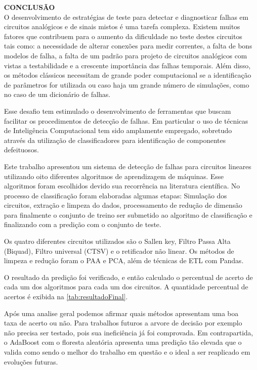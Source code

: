 \noindent\textbf{CONCLUSÃO}
$\!$\\



O desenvolvimento de estratégias de teste para detectar e diagnosticar falhas em
circuitos analógicos e de sinais mistos é uma tarefa complexa. Existem muitos fatores que
contribuem para o aumento da dificuldade no teste destes circuitos tais como: a necessidade de alterar conexões para medir correntes, a falta de bons modelos de falha, a falta de um
padrão para projeto de circuitos analógicos com vistas a testabilidade e a crescente
importância das falhas temporais. Além disso, os métodos clássicos necessitam de grande
poder computacional se a identificação de parâmetros for utilizada ou caso haja um grande número
de simulações, como no caso de um dicionário de falhas.

Esse desafio tem estimulado o desenvolvimento de ferramentas que buscam facilitar
os procedimentos de detecção de falhas. Em particular o uso de técnicas de Inteligência
Computacional tem sido amplamente empregado, sobretudo através da utilização de
classificadores para identificação de componentes defeituosos.

Este trabalho apresentou um sistema de detecção de falhas para circuitos lineares utilizando  oito diferentes algoritmos de aprendizagem de máquinas. Esse algoritmos foram escolhidos devido sua recorrência na literatura científica. No processo de classificação foram elaboradas algumas etapas: Simulação dos circuitos, extração e limpeza do dados, processamento de redução de dimensão para finalmente o conjunto de treino ser submetido ao algoritmo de classificação e finalizando com a predição com o conjunto de teste. 

Os quatro diferentes circuitos utilizados são o Sallen key, Filtro Passa Alta (Biquad), Filtro universal (CTSV) e o retificador não linear. Os métodos de limpeza e redução foram o PAA e PCA, além de técnicas de ETL com Pandas. 

O resultado da predição foi verificado, e então calculado o percentual de acerto de cada um dos algoritmos para cada um dos circuitos. A quantidade percentual de acertos é exibida na \ref{tab:resultadoFinal}.

Após uma analise geral podemos afirmar quais métodos apresentam uma boa taxa de acerto ou não. Para trabalhos futuros a arvore de decisão por exemplo não precisa ser testado, pois sua ineficiência já foi comprovada.  Em contrapartida, o AdaBoost com o floresta aleatória apresenta uma predição tão elevada que o valida como sendo o melhor do trabalho em questão e o ideal a ser reaplicado em evoluções futuras. 












